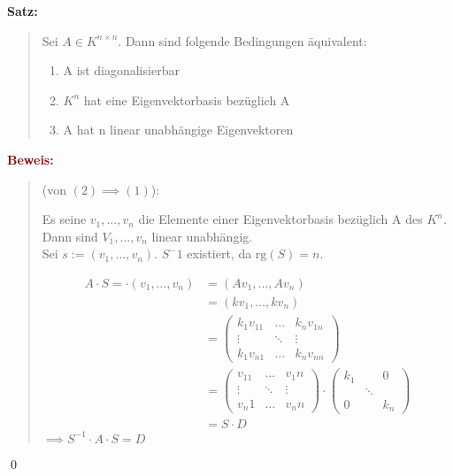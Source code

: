 \documentclass{article}
\newcommand{\dgr}[1]{\textcolor{dgr}{#1}}
\newcommand{\maroon}[1]{\textcolor{maroon}{#1}}
\newcommand{\se}[1]{\dgr{\textbf{Satz: }}\begin{quote}#1\end{quote}}
\newcommand{\pr}[1]{\maroon{\textbf{Beweis: }}\begin{quote}#1\end{quote}\qed}
\newcommand{\rg}{\text{rg}}
\begin{document}
\se{
    Sei $A \in K^{n \times n}$. Dann sind folgende Bedingungen äquivalent:
    \begin{enumerate}
        \item A ist diagonalisierbar
        \item $K^n$ hat eine Eigenvektorbasis bezüglich A
        \item A hat n linear unabhängige Eigenvektoren
    \end{enumerate}
}
\pr{
    (von $(2) \implies (1)$):

    Es seine $v_1, \dots, v_n$ die Elemente einer Eigenvektorbasis bezüglich A des $K^n$. Dann sind $V_1, \dots, v_n$ linear unabhängig.\\
    Sei $s := (v_1, \dots, v_n)$. $S^-1$ existiert, da $\rg(S) = n$.

    \begin{align*}
        A \cdot S =  \cdot (v_1, \dots, v_n) &= (Av_1, \dots, Av_n)\\
        &= (kv_1, \dots, kv_n)\\
        &= \begin{pmatrix}
            k_1v_{11} & \dots & k_nv_{1n}\\
            \vdots & \ddots & \vdots\\
            k_1v_{n1} & \dots & k_nv_{nn}
        \end{pmatrix}\\
        &= \begin{pmatrix}
            v_11 & \dots & v_1n\\
            \vdots & \ddots & \vdots\\
            v_n1 & \dots & v_nn
        \end{pmatrix} \cdot \begin{pmatrix}
            k_1 & & 0\\
            & \ddots &\\
            0 & & k_n
        \end{pmatrix}\\
        &= S \cdot D
    \end{align*}
    $\implies S^{-1} \cdot A \cdot S = D$
}
\end{document}

